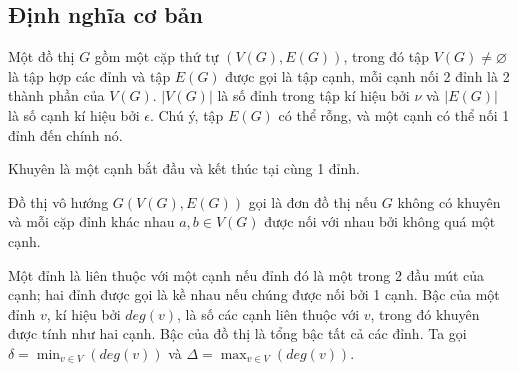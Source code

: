 \subsection{Định nghĩa cơ bản}


\begin{definition}[Đồ thị]
    Một đồ thị $G$ gồm một cặp thứ tự $(V(G),E(G))$, trong đó tập $V(G) \neq \varnothing $ là tập hợp các đỉnh và tập $E(G)$ được gọi là tập cạnh,
    mỗi cạnh nối 2 đỉnh là 2 thành phần của $V(G)$.
    $|V(G)|$ là số đỉnh trong tập kí hiệu bởi $\nu$ và $|E(G)|$ là số cạnh kí hiệu bởi $\epsilon$.
    Chú ý, tập $E(G)$ có thể rỗng, và một cạnh có thể nối 1 đỉnh đến chính nó.
\end{definition}

\begin{definition}[Khuyên]
    Khuyên là một cạnh bắt đầu và kết thúc tại cùng 1 đỉnh.
\end{definition}

\begin{definition}
    Đồ thị vô hướng $G(V(G),E(G))$ gọi là đơn đồ thị nếu $G$ không có khuyên và mỗi cặp đỉnh khác nhau $a,b \in V(G)$ được nối với nhau bởi không quá một cạnh.
\end{definition}
\begin{definition}
    Một đỉnh là liên thuộc với một cạnh nếu đỉnh đó là một trong 2 đầu mút của cạnh; hai đỉnh được gọi là kề nhau nếu chúng được nối bởi 1 cạnh.
    Bậc của một đỉnh $v$, kí hiệu bởi $deg(v)$, là số các cạnh liên thuộc với $v$, trong đó khuyên được tính như hai cạnh. Bậc của đồ thị là tổng bậc tất cả các đỉnh.
    Ta gọi $\delta = \displaystyle\min_{v \in V}(deg (v))$ và $\Delta = \displaystyle\max_{v \in V}(deg (v))$.
\end{definition}

